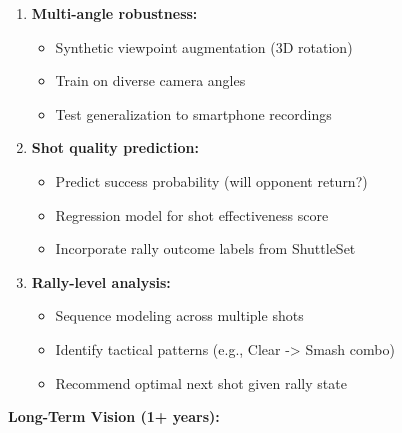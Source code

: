 \documentclass[11pt,a4paper]{article}
\begin{document}
\begin{enumerate}
\item \textbf{Multi-angle robustness:}
   \begin{itemize}
   \item Synthetic viewpoint augmentation (3D rotation)
   \item Train on diverse camera angles
   \item Test generalization to smartphone recordings
   \end{itemize}

\item \textbf{Shot quality prediction:}
   \begin{itemize}
   \item Predict success probability (will opponent return?)
   \item Regression model for shot effectiveness score
   \item Incorporate rally outcome labels from ShuttleSet
   \end{itemize}

\item \textbf{Rally-level analysis:}
   \begin{itemize}
   \item Sequence modeling across multiple shots
   \item Identify tactical patterns (e.g., Clear -> Smash combo)
   \item Recommend optimal next shot given rally state
   \end{itemize}
\end{enumerate}

\textbf{Long-Term Vision (1+ years):}
\end{document}
